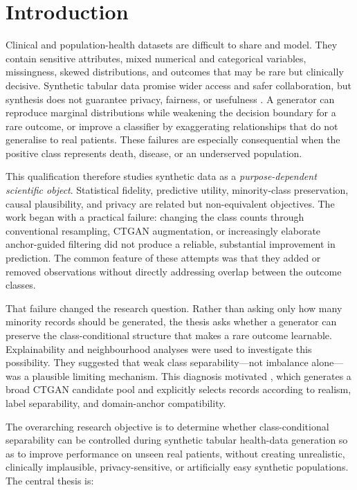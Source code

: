 \chapter{Introduction}
\label{chap:introduction}

Clinical and population-health datasets are difficult to share and model. They contain sensitive attributes, mixed numerical and categorical variables, missingness, skewed distributions, and outcomes that may be rare but clinically decisive. Synthetic tabular data promise wider access and safer collaboration, but synthesis does not guarantee privacy, fairness, or usefulness \citep{goncalves2020,hernandez2023,nanevski2026}. A generator can reproduce marginal distributions while weakening the decision boundary for a rare outcome, or improve a classifier by exaggerating relationships that do not generalise to real patients. These failures are especially consequential when the positive class represents death, disease, or an underserved population.

This qualification therefore studies synthetic data as a \emph{purpose-dependent scientific object}. Statistical fidelity, predictive utility, minority-class preservation, causal plausibility, and privacy are related but non-equivalent objectives. The work began with a practical failure: changing the class counts through conventional resampling, CTGAN augmentation, or increasingly elaborate anchor-guided filtering did not produce a reliable, substantial improvement in prediction. The common feature of these attempts was that they added or removed observations without directly addressing overlap between the outcome classes.

That failure changed the research question. Rather than asking only how many minority records should be generated, the thesis asks whether a generator can preserve the class-conditional structure that makes a rare outcome learnable. Explainability and neighbourhood analyses were used to investigate this possibility. They suggested that weak class separability---not imbalance alone---was a plausible limiting mechanism. This diagnosis motivated \sepa{}, which generates a broad CTGAN candidate pool and explicitly selects records according to realism, label separability, and domain-anchor compatibility.

The overarching research objective is to determine whether class-conditional separability can be controlled during synthetic tabular health-data generation so as to improve performance on unseen real patients, without creating unrealistic, clinically implausible, privacy-sensitive, or artificially easy synthetic populations. The central thesis is:

